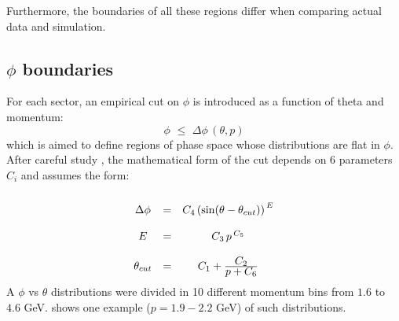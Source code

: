 Furthermore, the boundaries of all these regions differ
when comparing actual data and simulation.

\subsection{ $\phi$ boundaries}
For each sector, an empirical cut on $\phi$ is introduced as a function of theta and momentum:
$$ 
 \phi \,\,\le\,\, \Delta\phi \,(\theta, p)
$$
which is aimed to define regions of phase space whose distributions are flat in $\phi$.
After careful study \cite{bib:fid_e}, the mathematical form of the cut depends on 6 parameters  $C_i$
and assumes the form:\vspace{-0.3 cm}
$$
\begin{array}{c c c}
\\
\Delta\phi   & = &  C_4 \left( \sin (\theta - \theta_{cut}) \right) ^{\,E} \\
\\
E        & = &  C_3\, p\, ^{C_5} \\
\\
\theta_{cut} & = &  C_1 + \frac{\displaystyle C_2}{\displaystyle p + C_6}
\end{array}
$$
A $\phi$ vs $\theta$ distributions were divided in 10  different momentum bins from $1.6$ to $4.6$ GeV.
 shows one example ($p=1.9-2.2$ GeV) of such distributions.
